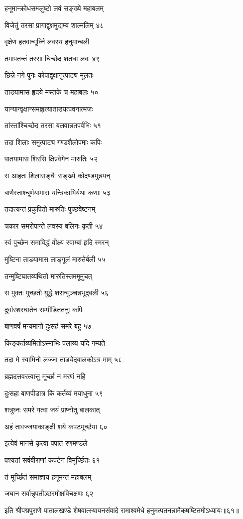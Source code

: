 हनूमान्क्रोधसम्प्लुष्टो लवं सङ्ख्ये महाबलम्

विजेतुं तरसा प्रागाद्वृक्षमुद्यम्य शाल्मलिम् ४८

वृक्षेण हतवान्मूर्ध्नि लवस्य हनुमान्बली

तमापतन्तं तरसा चिच्छेद शतधा लवः ४९

छिन्ने नगे पुनः कोपाद्वृक्षानुत्पाट्य मूलतः

ताडयामास हृदये मस्तके च महाबलः ५०

यान्यान्वृक्षान्समाहृत्याताडयत्पवनात्मजः

तांस्तांश्चिच्छेद तरसा बलवान्नतपर्वभिः ५१

तदा शिलाः समुत्पाट्य गण्डशैलोपमाः कपिः

पातयामास शिरसि क्षिप्रवेगेन मारुतिः ५२

स आहतः शिलासङ्घैः सङ्ख्ये कोदण्डमुन्नयन्

बाणैस्ताश्चूर्णयामास यन्त्रिकाभिर्यथा कणाः ५३

तदात्यन्तं प्रकुपितो मारुतिः पुच्छवेष्टनम्

चकार समरोपान्ते लवस्य बलिनः कृती ५४

स्वं पुच्छेन समाविद्धं वीक्ष्य स्वाम्बां हृदि स्मरन्

मुष्टिना ताडयामास लाङ्गूलं मारुतेर्बली ५५

तन्मुष्टिघातव्यथितो मारुतिस्तममूमुचत्

स मुक्तः पुच्छतो युद्धे शरान्मुञ्चन्नभूद्बली ५६

दुर्वारशरघातेन सम्पीडिततनुः कपिः

बाणवर्षं मन्यमानो दुःसहं समरे बहु ५७

किङ्कर्तव्यमितोऽस्माभिः पलाय्य यदि गम्यते

तदा मे स्वामिनो लज्जा ताडयेद्बालकोऽत्र माम् ५८

ब्रह्मदत्तवरत्वात्तु मूर्च्छा न मरणं नहि

दुःसहा बाणपीडात्र किं कर्तव्यं मयाधुना ५९

शत्रुघ्नः समरे गत्वा जयं प्राप्नोतु बालकात्

अहं तावज्जयाकाङ्क्षी शये कपटमूर्च्छया ६०

इत्येवं मानसे कृत्वा पपात रणमण्डले

पश्यतां सर्ववीराणां कपटेन विमूर्च्छितः ६१

तं मूर्च्छितं समाज्ञाय हनूमन्तं महाबलम्

जघान सर्वान्नृपतीञ्छरमोक्षविचक्षणः ६२

इति श्रीपद्मपुराणे पातालखण्डे शेषवात्स्यायनसंवादे रामाश्वमेधे हनुमत्पतनन्नामैकषष्टितमोऽध्यायः॥६१॥

